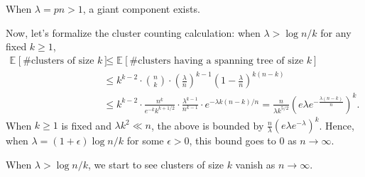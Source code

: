 \begin{prev}
	When \(\lambda = pn > 1\), a giant component exists.
\end{prev}

Now, let's formalize the cluster counting calculation: when \(\lambda > \log n / k\) for any fixed \(k \geq 1\),
\begin{equation}\label{eq:Erdős-Rényi-cluster-size}
	\begin{split}
		\mathbb{E}_{}[\text{\#clusters of size \(k\)}]
		 & \leq \mathbb{E}_{}[\text{\#clusters having a spanning tree of size \(k\)} ]                                                   \\
		 & \leq k^{k-2} \cdot \binom{n}{k} \cdot \left( \frac{\lambda }{n} \right) ^{k-1} \left( 1 - \frac{\lambda}{n} \right) ^{k(n-k)} \\
		 & \leq k^{k-2} \cdot \frac{n^k}{e^{-k} k^{k + 1 / 2}} \cdot \frac{\lambda ^{k-1}}{n^{k-1}} \cdot e^{- \lambda k(n-k) / n}
		= \frac{n}{\lambda k^{5 / 2}} \left( e \lambda e^{- \frac{\lambda (n-k)}{n}} \right) ^k.
	\end{split}
\end{equation}
When \(k \geq 1\) is fixed and \(\lambda k^2 \ll n\), the above is bounded by \(\frac{n}{\lambda } (e \lambda e^{-\lambda })^k\). Hence, when \(\lambda = (1 + \epsilon ) \log n / k\) for some \(\epsilon > 0\), this bound goes to \(0\) as \(n \to \infty \).

\begin{remark}
	When \(\lambda > \log n / k\), we start to see clusters of size \(k\) vanish as \(n \to \infty \).
\end{remark}

